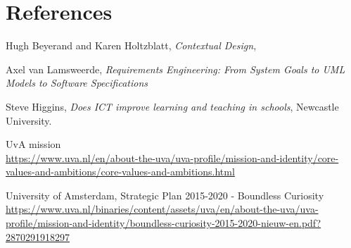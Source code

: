 \chapter{References}

\begin{thebibliography}{9}
	
	Hugh Beyerand and Karen Holtzblatt,
	\emph{Contextual Design},
	
	Axel van Lamsweerde,
	\emph{Requirements Engineering: From System Goals to UML Models to Software Specifications}
	
	Steve Higgins,
	\emph{Does ICT improve learning and teaching in schools},
	Newcastle University.
	
	UvA mission \\
	\url{https://www.uva.nl/en/about-the-uva/uva-profile/mission-and-identity/core-values-and-ambitions/core-values-and-ambitions.html}
	
	University of Amsterdam,
	Strategic Plan 2015-2020 - Boundless Curiosity \\
	\url{https://www.uva.nl/binaries/content/assets/uva/en/about-the-uva/uva-profile/mission-and-identity/boundless-curiosity-2015-2020-nieuw-en.pdf?2870291918297}
	
	

	
\end{thebibliography}


\appendix



